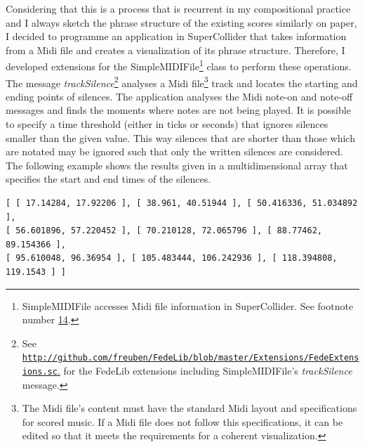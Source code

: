 Considering that this is a process that is recurrent in my compositional practice and I always sketch the phrase structure of the existing scores similarly on paper, I decided to programme an application in SuperCollider that takes information from a Midi file and creates a visualization of its phrase structure. Therefore, I developed extensions for the SimpleMIDIFile\footnote{SimpleMIDIFile accesses Midi file information in SuperCollider. See footnote number \hyperlink{wlib}{14}.} class to perform these operations. The message \emph{trackSilence}\footnote{See \href{http://github.com/freuben/FedeLib/blob/master/Extensions/FedeExtensions.sc}{\texttt{http://github.com/freuben/FedeLib/blob/master/Extensions/FedeExtensions.sc}.} for the FedeLib extensions including SimpleMIDIFile's \emph{trackSilence} message.} analyses a Midi file\footnote{The Midi file's content must have the standard Midi layout and specifications for scored music. If a Midi file does not follow this specifications, it can be edited so that it meets the requirements for a coherent visualization.} track and locates the starting and ending points of silences. The application analyses the Midi note-on and note-off messages and finds the moments where notes are not being played. It is possible to specify a time threshold (either in ticks or seconds) that ignores silences smaller than the given value. This way silences that are shorter than those which are notated may be ignored such that only the written silences are considered. The following example shows  the results given in a multidimensional array that specifies the start and end times of the silences.
\begin{verbatim}
[ [ 17.14284, 17.92206 ], [ 38.961, 40.51944 ], [ 50.416336, 51.034892 ], 
[ 56.601896, 57.220452 ], [ 70.210128, 72.065796 ], [ 88.77462, 89.154366 ], 
[ 95.610048, 96.36954 ], [ 105.483444, 106.242936 ], [ 118.394808, 119.1543 ] ]
\end{verbatim}

